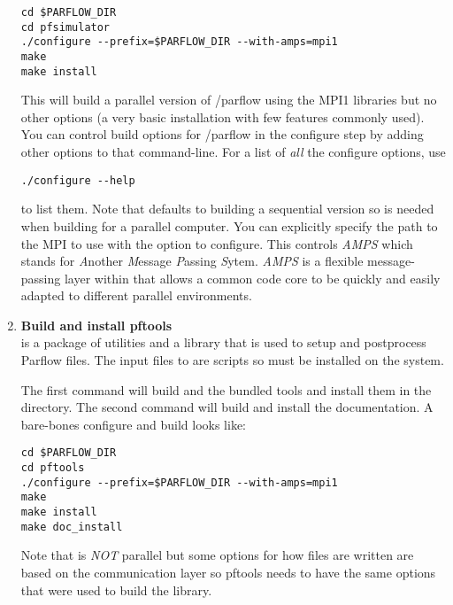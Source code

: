 \begin{enumerate}
\begin{display}\begin{verbatim}
cd $PARFLOW_DIR
cd pfsimulator
./configure --prefix=$PARFLOW_DIR --with-amps=mpi1
make 
make install
\end{verbatim}\end{display}

This will build a parallel version of /parflow{} using the MPI1 
libraries but no other options (a very basic installation with few features commonly used).
You can control build options for /parflow{} in the configure step by adding other 
options to that command-line. For a list of \emph{all} the configure options, use
\begin{display}\begin{verbatim}
./configure --help 
\end{verbatim}\end{display} to list them.  Note that \parflow{} defaults to building a sequential version so
 is needed when building for a parallel computer.
  You can explicitly specify the path to the MPI to use with the
  option to configure.  This controls \emph{AMPS}
 which stands for \emph{A}nother \emph{M}essage \emph{P}assing
 \emph{S}ytem.  \emph{AMPS} is a flexible message-passing layer within
 \parflow{} that allows a common code core to be quickly and easily
 adapted to different parallel environments. 

\item {\bf Build and install pftools}\\ 
 is a package of utilities and a  library that
 is used to setup and postprocess Parflow files.  The input files to
 \parflow{} are  scripts so  must be installed on
 the system.

The first command will build \parflow{} and the bundled tools and
 install them in the  directory.  The second
 command will build and install the documentation.  A bare-bones
 configure and build looks like:

\begin{display}\begin{verbatim}
cd $PARFLOW_DIR
cd pftools
./configure --prefix=$PARFLOW_DIR --with-amps=mpi1
make 
make install
make doc_install
\end{verbatim}\end{display}

Note that  is \emph{NOT} parallel but some options for
how files are written are based on the communication layer so pftools
needs to have the same options that were used to build the \parflow{}
library.


\end{enumerate}
